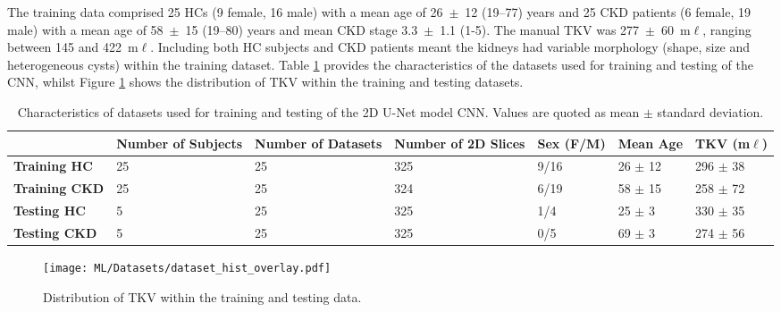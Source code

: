 The training data comprised 25 \acp{HC} (9 female, 16 male) with a mean age of 26~$\pm$~12 (19–77) years and 25 \ac{CKD} patients (6 female, 19 male) with a mean age of 58~$\pm$~15 (19–80) years and mean \ac{CKD} stage 3.3~$\pm$~1.1 (1-5). The manual \ac{TKV} was 277~$\pm$~60~m$\ell$, ranging between 145 and 422~m$\ell$. Including both \ac{HC} subjects and \ac{CKD} patients meant the kidneys had variable morphology (shape, size and heterogeneous cysts) within the training dataset. Table \ref{tab:ml_datasets} provides the characteristics of the datasets used for training and testing of the \ac{CNN}, whilst Figure \ref{fig:ml_true_tkv_hist} shows the distribution of \ac{TKV} within the training and testing datasets.
\begin{table}[H]
	\centering
	\begin{adjustbox}{width=1.0\textwidth, center}
	\begin{tabularx}{1.1\textwidth}{X|X|X|X|X|X|X}
		& \textbf{Number of Subjects} & \textbf{Number of Datasets} & \textbf{Number of 2D Slices} & \textbf{Sex (F/M)} & \textbf{Mean Age} & \textbf{TKV (m$\ell$)} \\ \hline
		\textbf{Training HC}  & 25                          & 25                          & 325                          & 9/16               & 26 $\pm$ 12       & 296 $\pm$ 38           \\
		\hline
		\textbf{Training CKD} & 25                          & 25                          & 324                          & 6/19               & 58 $\pm$ 15       & 258 $\pm$ 72           \\
		\hline
		\textbf{Testing HC}   & 5                           & 25                          & 325                          & 1/4                & 25 $\pm$ 3        & 330 $\pm$ 35           \\
		\hline
		\textbf{Testing CKD} & 5                           & 25                          & 325                          & 0/5                & 69 $\pm$ 3        & 274 $\pm$ 56          
	\end{tabularx}
	\end{adjustbox}
	\caption{Characteristics of datasets used for training and testing of the 2D U-Net model \ac{CNN}. Values are quoted as mean $\pm$ standard deviation.}
	\label{tab:ml_datasets}
\end{table}
\begin{figure}[H]
	\centering
	\texttt{[image: ML/Datasets/dataset\_hist\_overlay.pdf]}
	\caption{Distribution of \ac{TKV} within the training and testing data.}
	\label{fig:ml_true_tkv_hist}	
\end{figure}

